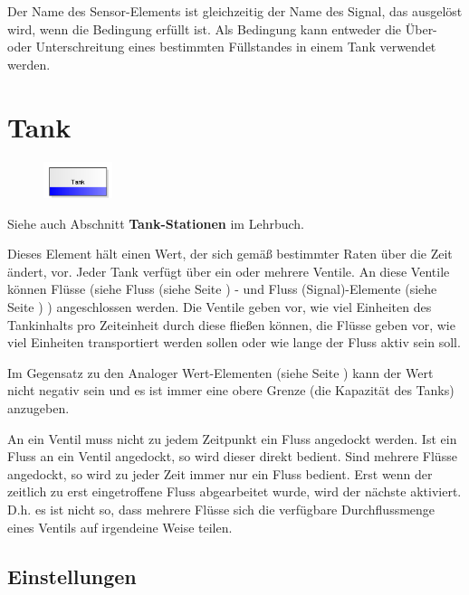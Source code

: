 Der Name des Sensor-Elements ist gleichzeitig der Name des Signal, das ausgelöst wird, wenn die Bedingung erfüllt ist.
Als Bedingung kann entweder die Über- oder Unterschreitung eines bestimmten Füllstandes in einem
Tank verwendet werden.


\section{Tank}
\label{ref:ModelElementTank}

\begin{figure}
\vspace{-22pt}
\includegraphics[width=2cm]{imageModelElementTank.png}
\vspace{-22pt}
\end{figure}

Siehe auch Abschnitt \textbf{Tank-Stationen} im Lehrbuch.

Dieses Element hält einen Wert, der sich gemäß bestimmter Raten über die Zeit ändert, vor.
Jeder Tank verfügt über ein oder mehrere Ventile. An diese Ventile können Flüsse
(siehe Fluss (siehe Seite \pageref{ref:ModelElementTankFlowByClient}) - und
Fluss (Signal)-Elemente (siehe Seite \pageref{ref:ModelElementTankFlowBySignal}) ) angeschlossen werden.
Die Ventile geben vor, wie viel Einheiten des Tankinhalts pro Zeiteinheit durch diese
fließen können, die Flüsse geben vor, wie viel Einheiten transportiert werden sollen oder
wie lange der Fluss aktiv sein soll.

Im Gegensatz zu den Analoger Wert-Elementen (siehe Seite \pageref{ref:ModelElementAnalogValue}) 
kann der Wert nicht negativ sein und es ist immer eine obere Grenze (die Kapazität des Tanks)
anzugeben.

An ein Ventil muss nicht zu jedem Zeitpunkt ein Fluss angedockt werden.
Ist ein Fluss an ein Ventil angedockt, so wird dieser direkt bedient.
Sind mehrere Flüsse angedockt, so wird zu jeder Zeit immer nur ein Fluss bedient.
Erst wenn der zeitlich zu erst eingetroffene Fluss abgearbeitet wurde, wird der nächste
aktiviert. D.h. es ist nicht so, dass mehrere Flüsse sich die verfügbare Durchflussmenge
eines Ventils auf irgendeine Weise teilen.

\subsection*{Einstellungen}

